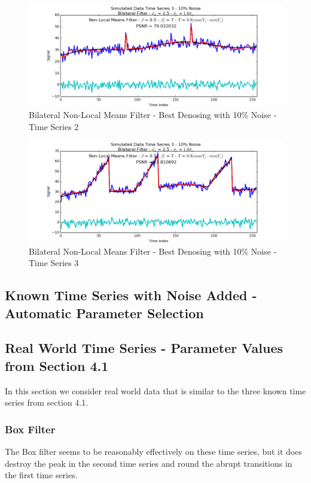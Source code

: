 \documentclass[11pt]{article}
\theoremstyle{definition}
\begin{document}
\begin{figure}
\centering
\includegraphics[width = 0.75 \textwidth]{BilateralNLMeansSignal2Best.png}
\caption{Bilateral Non-Local Means Filter - Best Denosing with 10\% Noise - Time Series 2}
\label{bilateralnlmeans2best}
\end{figure}

\begin{figure}
\centering
\includegraphics[width = 0.75 \textwidth]{BilateralNLMeansSignal3Best.png}
\caption{Bilateral Non-Local Means Filter - Best Denosing with 10\% Noise - Time Series 3}
\label{bilateralnlmeans3best}
\end{figure}

\newpage


\subsection{Known Time Series with Noise Added - Automatic Parameter Selection}


\subsection{Real World Time Series - Parameter Values from Section 4.1}

In this section we consider real world data that is similar to the three known time series from section 4.1.

\subsubsection{Box Filter}

The Box filter seems to be reasonably effectively on these time series, but it does destroy the peak in the second time series and round the abrupt transitions in the first time series.
\end{document}
